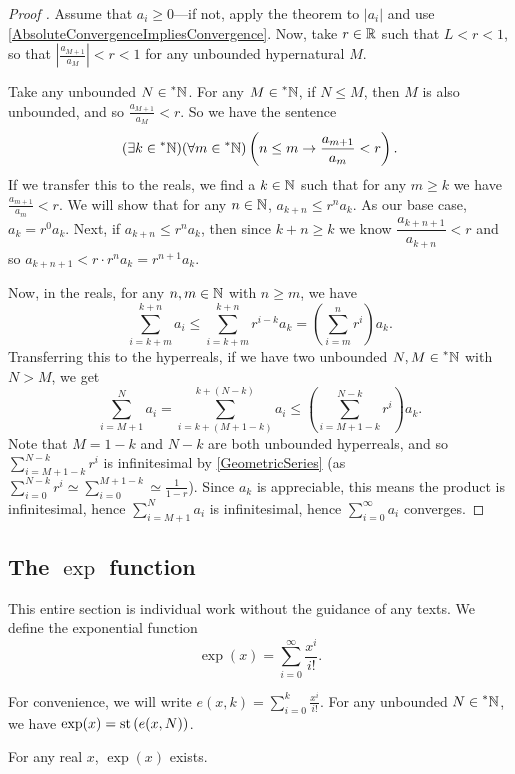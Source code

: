 \begin{proof}[Proof ]
    Assume that $a_i \geq 0$---if not, apply the theorem to $|a_i|$ and use \autoref{AbsoluteConvergenceImpliesConvergence}. Now, take $r \in \mathbb{R}$ such that $L < r < 1$, so that $\left|\frac{a_{M+1}}{a_M}\right| < r < 1$ for any unbounded hypernatural $M$.

    Take any unbounded $N \in \prescript{*}{}{\mathbb{N}}$. For any $M \in \prescript{*}{}{\mathbb{N}}$, if $N \leq M$, then $M$ is also unbounded, and so $\frac{a_{M+1}}{a_M} < r$. So we have the sentence
    \[ 
    (\exists k \in \prescript{*}{}{\mathbb{N}})(\forall m \in \prescript{*}{}{\mathbb{N}})\left(n \leq m \to \frac{a_{m+1}}{a_m} < r\right). 
    \]
    If we transfer this to the reals, we find a $k \in \mathbb{N}$ such that for any $m \geq k$ we have $\frac{a_{m+1}}{a_m} < r$. We will show that for any $n \in \mathbb{N}$, $a_{k+n} \leq r^n a_k$. As our base case, $a_k = r^0 a_k$. Next, if $a_{k+n} \leq r^n a_k$, then since $k+n \geq k$ we know $\dfrac{a_{k+n+1}}{a_{k+n}} < r$ and so $a_{k+n+1} < r \cdot r^n a_k = r^{n+1}a_k$.

    Now, in the reals, for any $n, m \in \mathbb{N}$ with $n \geq m$, we have 
    \[ 
    \sum_{i=k+m}^{k+n} a_i \leq \sum_{i=k+m}^{k+n} r^{i-k} a_k = \left(\sum_{i=m}^n r^i\right) a_k. 
    \]
    Transferring this to the hyperreals, if we have two unbounded $N, M \in \prescript{*}{}{\mathbb{N}}$ with $N > M$, we get
    \[ 
    \sum_{i=M+1}^N a_i = \sum_{i=k+(M+1-k)}^{k+(N-k)} a_i \leq \left(\sum_{i=M+1-k}^{N-k} r^i \right) a_k. 
    \]
    Note that $M=1-k$ and $N-k$ are both unbounded hyperreals, and so $\sum_{i=M+1-k}^{N-k} r^i$ is infinitesimal by \autoref{GeometricSeries} (as $\sum_{i=0}^{N-k} r^i \simeq \sum_{i=0}^{M+1-k} \simeq \frac{1}{1-r}$). Since $a_k$ is appreciable, this means the product is infinitesimal, hence $\sum_{i=M+1}^N a_i$ is infinitesimal, hence $\sum_{i=0}^\infty a_i$ converges.
\end{proof}

\subsection{The $\exp$ function}
This entire section is individual work without the guidance of any texts. We define the exponential function \[\exp(x) = \sum_{i=0}^\infty \frac{x^i}{i!}.\]

For convenience, we will write $e(x, k) = \sum_{i=0}^k \frac{x^i}{i!}$. For any unbounded $N \in \prescript{*}{}{\mathbb{N}}$, we have $\exp(x) = \operatorname{st}\left(e(x, N)\right)$.

\begin{thm}\label{expExists}
    For any real $x$, $\exp(x)$ exists.
\end{thm}

